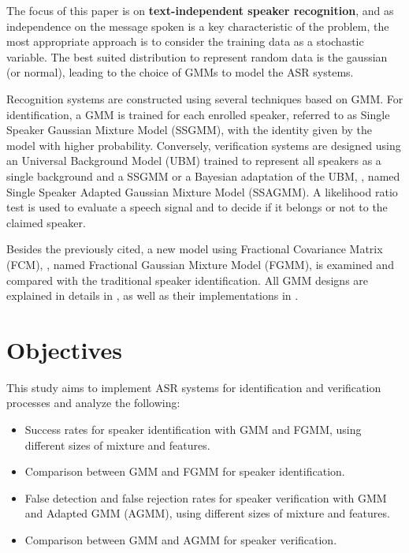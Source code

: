 The focus of this paper is on \textbf{text-independent speaker recognition}, and as independence on the message spoken is a key characteristic of the problem, the most appropriate approach is to consider the training data as a stochastic variable. The best suited distribution to represent random data is the gaussian (or normal), leading to the choice of GMMs to model the ASR systems.

Recognition systems are constructed using several techniques based on GMM. For identification, a GMM is trained for each enrolled speaker, referred to as Single Speaker Gaussian Mixture Model (SSGMM), with the identity given by the model with higher probability. Conversely, verification systems are designed using an Universal Background Model (UBM) trained to represent all speakers as a single background and a SSGMM or a Bayesian adaptation of the UBM, , named Single Speaker Adapted Gaussian Mixture Model (SSAGMM). A likelihood ratio test is used to evaluate a speech signal and to decide if it belongs or not to the claimed speaker.

Besides the previously cited, a new model using Fractional Covariance Matrix (FCM), , named Fractional Gaussian Mixture Model (FGMM), is examined and compared with the traditional speaker identification. All GMM designs are explained in details in , as well as their implementations in .

\section{Objectives}

This study aims to implement ASR systems for identification and verification processes and analyze the following:

\begin{itemize}\itemsep0pt
    \item Success rates for speaker identification with GMM and FGMM, using different sizes of mixture and features.
    \item Comparison between GMM and FGMM for speaker identification.
    \item False detection and false rejection rates for speaker verification with GMM and Adapted GMM (AGMM), using different sizes of mixture and features.
    \item Comparison between GMM and AGMM for speaker verification.
\end{itemize}

